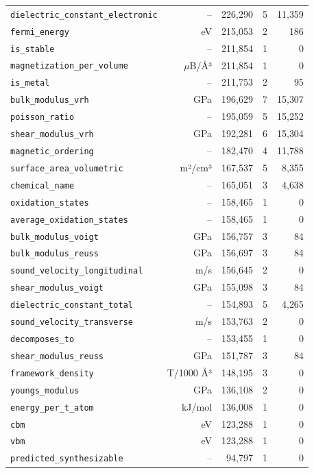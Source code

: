 \begin{longtable}{lrrrr}
\texttt{dielectric\_constant\_electronic} & -- & 226{,}290 & 5 & 11{,}359 \\
\texttt{fermi\_energy} & eV & 215{,}053 & 2 & 186 \\
\texttt{is\_stable} & -- & 211{,}854 & 1 & 0 \\
\texttt{magnetization\_per\_volume} & $\mu$B/Å³ & 211{,}854 & 1 & 0 \\
\texttt{is\_metal} & -- & 211{,}753 & 2 & 95 \\
\texttt{bulk\_modulus\_vrh} & GPa & 196{,}629 & 7 & 15{,}307 \\
\texttt{poisson\_ratio} & -- & 195{,}059 & 5 & 15{,}252 \\
\texttt{shear\_modulus\_vrh} & GPa & 192{,}281 & 6 & 15{,}304 \\
\texttt{magnetic\_ordering} & -- & 182{,}470 & 4 & 11{,}788 \\
\texttt{surface\_area\_volumetric} & m²/cm³ & 167{,}537 & 5 & 8{,}355 \\
\texttt{chemical\_name} & -- & 165{,}051 & 3 & 4{,}638 \\
\texttt{oxidation\_states} & -- & 158{,}465 & 1 & 0 \\
\texttt{average\_oxidation\_states} & -- & 158{,}465 & 1 & 0 \\
\texttt{bulk\_modulus\_voigt} & GPa & 156{,}757 & 3 & 84 \\
\texttt{bulk\_modulus\_reuss} & GPa & 156{,}697 & 3 & 84 \\
\texttt{sound\_velocity\_longitudinal} & m/s & 156{,}645 & 2 & 0 \\
\texttt{shear\_modulus\_voigt} & GPa & 155{,}098 & 3 & 84 \\
\texttt{dielectric\_constant\_total} & -- & 154{,}893 & 5 & 4{,}265 \\
\texttt{sound\_velocity\_transverse} & m/s & 153{,}763 & 2 & 0 \\
\texttt{decomposes\_to} & -- & 153{,}455 & 1 & 0 \\
\texttt{shear\_modulus\_reuss} & GPa & 151{,}787 & 3 & 84 \\
\texttt{framework\_density} & T/1000 Å³ & 148{,}195 & 3 & 0 \\
\texttt{youngs\_modulus} & GPa & 136{,}108 & 2 & 0 \\
\texttt{energy\_per\_t\_atom} & kJ/mol & 136{,}008 & 1 & 0 \\
\texttt{cbm} & eV & 123{,}288 & 1 & 0 \\
\texttt{vbm} & eV & 123{,}288 & 1 & 0 \\
\texttt{predicted\_synthesizable} & -- & 94{,}797 & 1 & 0 \\

\end{longtable}
